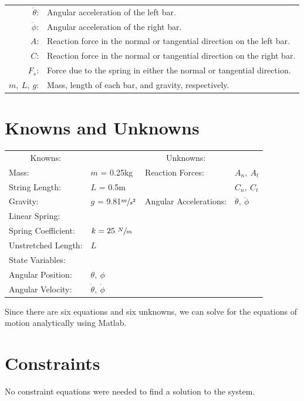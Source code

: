\documentclass[12pt]{report}
\begin{document}
\begin{flushleft}
\begin{tabular}{rl}
$\ddot{\theta}$:& Angular acceleration of the left bar. \\
$\ddot{\phi}$:& Angular acceleration of the right bar. \\
$A$:& Reaction force in the normal or tangential direction on the left bar. \\
$C$:& Reaction force in the normal or tangential direction on the right bar. \\
$F_s$:& Force due to the spring in either the normal or tangential direction. \\
$m,~L,~g$: & Mass, length of each bar, and gravity, respectively.
\end{tabular}
\section{Knowns and Unknowns} \label{knownsandunknowns}
\begin{tabular}{ll@{\hskip .75in}ll}
  \multicolumn{1}{c}{Knowns:} && \multicolumn{1}{c}{Unknowns:} \\
  Mass: &$m$ = 0.25kg & Reaction Forces: & $A_n,~A_t$ \\
  String Length: &$L$ = 0.5m & & $C_n,~C_t$\\
  Gravity: &$g$ = 9.81$\sfrac{m}{s^2}$& Angular Accelerations: & $\ddot{\theta},~\ddot{\phi}$ \\
  Linear Spring: \\
  \quad Spring Coefficient:& $k = 25~\sfrac{N}{m}$\\
  \quad Unstretched Length:& $L$ \\
  State Variables: \\
  \quad Angular Position: &$\theta,~\phi$ & \\
  \quad Angular Velocity: &$\dot{\theta},~\dot{\phi}$ & \\
\end{tabular}
\vspace{2ex}

Since there are six equations and six unknowns, we can solve for the equations of
motion analytically using Matlab.

\section{Constraints}
No constraint equations were needed to find a solution to the system.

\end{flushleft}
\end{document}
